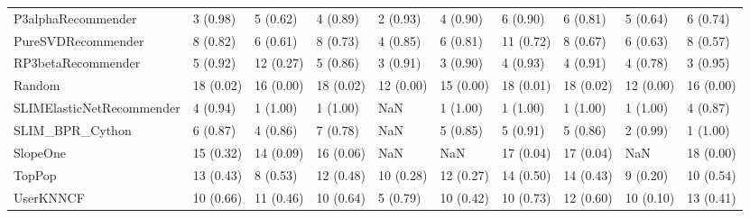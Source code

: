 \begin{tabular}{llllllllll}
                 P3alphaRecommender &                 3 (0.98) &    5 (0.62) &      4 (0.89) &     2 (0.93) &             4 (0.90) &            6 (0.90) &          6 (0.81) &           5 (0.64) &          6 (0.74) \\
                 PureSVDRecommender &                 8 (0.82) &    6 (0.61) &      8 (0.73) &     4 (0.85) &             6 (0.81) &           11 (0.72) &          8 (0.67) &           6 (0.63) &          8 (0.57) \\
                 RP3betaRecommender &                 5 (0.92) &   12 (0.27) &      5 (0.86) &     3 (0.91) &             3 (0.90) &            4 (0.93) &          4 (0.91) &           4 (0.78) &          3 (0.95) \\
                             Random &                18 (0.02) &   16 (0.00) &     18 (0.02) &    12 (0.00) &            15 (0.00) &           18 (0.01) &         18 (0.02) &          12 (0.00) &         16 (0.00) \\
          SLIMElasticNetRecommender &                 4 (0.94) &    1 (1.00) &      1 (1.00) &          NaN &             1 (1.00) &            1 (1.00) &          1 (1.00) &           1 (1.00) &          4 (0.87) \\
                    SLIM\_BPR\_Cython &                 6 (0.87) &    4 (0.86) &      7 (0.78) &          NaN &             5 (0.85) &            5 (0.91) &          5 (0.86) &           2 (0.99) &          1 (1.00) \\
                           SlopeOne &                15 (0.32) &   14 (0.09) &     16 (0.06) &          NaN &                  NaN &           17 (0.04) &         17 (0.04) &                NaN &         18 (0.00) \\
                             TopPop &                13 (0.43) &    8 (0.53) &     12 (0.48) &    10 (0.28) &            12 (0.27) &           14 (0.50) &         14 (0.43) &           9 (0.20) &         10 (0.54) \\
                          UserKNNCF &                10 (0.66) &   11 (0.46) &     10 (0.64) &     5 (0.79) &            10 (0.42) &           10 (0.73) &         12 (0.60) &          10 (0.10) &         13 (0.41) \\
\bottomrule
\end{tabular}
